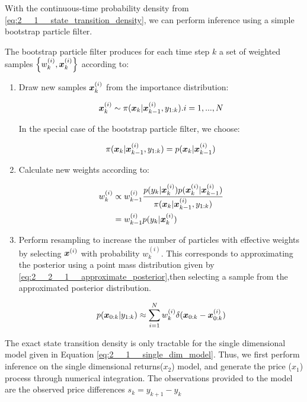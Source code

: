 \documentclass[../main.tex]{subfiles}
\begin{document}
	
With the continuous-time probability density from \autoref{eq:2__1__state_transition_density}, we can perform inference using a simple bootstrap particle filter. 

The bootstrap particle filter produces for each time step $k$ a set of weighted samples $\left\{	w_k^{(i)}, \bm{x}_k^{(i)}	 \right\}$ according to: 

\begin{enumerate}
	\item Draw new samples $\bm{x}_k^{(i)}$ from the importance distribution: 
	
	\begin{equation}
		\bm{x}_k^{(i)} \sim \pi(\bm{x}_k | \bm{x}_{k-1}^{(i)}, y_{1:k}). i=1,...,N
	\end{equation}
	
	In the special case of the bootstrap particle filter, we choose:
	
	\begin{equation}
		\pi(\bm{x}_k | \bm{x}_{k-1}^{(i)}, y_{1:k}) = p(\bm{x}_k | \bm{x}_{k-1}^{(i)} )
	\end{equation}
	
	\item Calculate new weights according to: 
	
	\begin{align}
		w_k^{(i)} &\propto w_{k-1}^{(i)} \frac{p(y_k | \bm{x}_k^{(i)})p(\bm{x}_k^{(i)} | \bm{x}_{k-1}^{(i)}) }{  	\pi(\bm{x}_k | \bm{x}_{k-1}^{(i)}, y_{1:k}) } \\
		&= w_{k-1}^{(i)} p(y_k | \bm{x}_k^{(i)}) \notag
	\end{align}

	\item Perform resampling to increase the number of particles with effective weights by selecting $\bm{x}^{(i)}$ with probability $w_k^{(i)}$. This corresponds to approximating the posterior using a point mass distribution given by \autoref{eq:2__2__1__approximate_posterior},then selecting a sample from the approximated posterior distribution. 
	
	\begin{equation}
		p(\bm{x} _{0:k} | y_{1:k} ) \approx \sum_{i=1}^N w_k^{(i)} \delta (\bm{x}_{0:k} - \bm{x}_{0:k}^{(i)})
		\label{eq:2__2__1__approximate_posterior}
	\end{equation}
	
\end{enumerate}

The exact state transition density is only tractable for the single dimensional model given in Equation \autoref{eq:2__1__single_dim_model}. Thus, we first perform inference on the single dimensional returns($x_2$) model, and generate the price ($x_1$) process through numerical integration. The observations provided to the model are the observed price differences $s_k = y_{k+1} - y_{k}$
\end{document}
